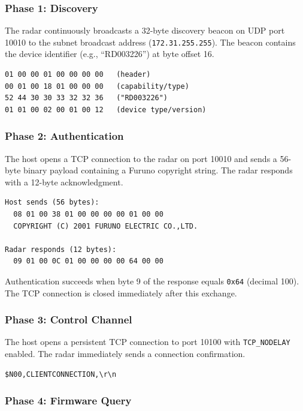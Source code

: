 \documentclass[11pt,letterpaper]{article}
\begin{document}
\subsubsection{Phase 1: Discovery}

The radar continuously broadcasts a 32-byte discovery beacon on UDP port 10010 to the subnet broadcast address (\texttt{172.31.255.255}). The beacon contains the device identifier (e.g., ``RD003226'') at byte offset 16.

\begin{lstlisting}
01 00 00 01 00 00 00 00   (header)
00 01 00 18 01 00 00 00   (capability/type)
52 44 30 30 33 32 32 36   ("RD003226")
01 01 00 02 00 01 00 12   (device type/version)
\end{lstlisting}

\subsubsection{Phase 2: Authentication}

The host opens a TCP connection to the radar on port 10010 and sends a 56-byte binary payload containing a Furuno copyright string. The radar responds with a 12-byte acknowledgment.

\begin{lstlisting}
Host sends (56 bytes):
  08 01 00 38 01 00 00 00 00 01 00 00
  COPYRIGHT (C) 2001 FURUNO ELECTRIC CO.,LTD.

Radar responds (12 bytes):
  09 01 00 0C 01 00 00 00 00 64 00 00
\end{lstlisting}

Authentication succeeds when byte 9 of the response equals \texttt{0x64} (decimal 100). The TCP connection is closed immediately after this exchange.

\subsubsection{Phase 3: Control Channel}

The host opens a persistent TCP connection to port 10100 with \texttt{TCP\_NODELAY} enabled. The radar immediately sends a connection confirmation.

\begin{lstlisting}
$N00,CLIENTCONNECTION,\r\n
\end{lstlisting}

\subsubsection{Phase 4: Firmware Query}
\end{document}
